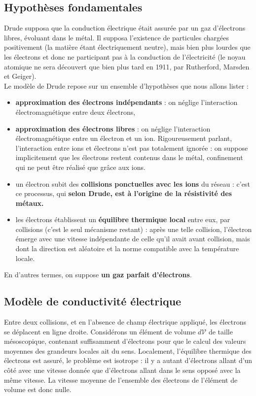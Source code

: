 \documentclass[11pt,a4paper]{report}
\begin{document}
\subsection{Hypothèses fondamentales}

Drude supposa que la conduction électrique était assurée par un gaz d'électrons libres, évoluant dans le métal. Il supposa l'existence de particules chargées positivement (la matière étant électriquement neutre), mais bien plus lourdes que les électrons et donc ne participant pas à la conduction de l'électricité (le noyau atomique ne sera découvert que bien plus tard en 1911, par Rutherford, Marsden et Geiger).\\
 
Le modèle de Drude repose sur un ensemble d'hypothèses que nous allons lister :
\begin{itemize}
	\item \textbf{approximation des électrons indépendants} : on néglige l'interaction électromagnétique entre deux électrons,
	\item \textbf{approximation des électrons libres} : on néglige l'interaction électromagnétique entre un électron et un ion. Rigoureusement parlant, l'interaction entre ions et électrons n'est pas totalement ignorée : on suppose implicitement que les électrons restent contenus dans le métal, confinement qui ne peut être réalisé que grâce aux ions.
	\item un électron subit des \textbf{collisions ponctuelles avec les ions} du réseau : c'est ce processus, qui \textbf{selon Drude, est à l'origine de la résistivité des métaux.} 
	\item les électrons établissent un \textbf{équilibre thermique local} entre eux, par collisions (c'est le seul mécanisme restant) : après une telle collision, l'électron émerge avec une vitesse indépendante de celle qu'il avait avant collision, mais dont la direction est aléatoire et la norme compatible avec la température locale.\\
\end{itemize}

En d'autres termes, on suppose \textbf{un gaz parfait d'électrons}.

\subsection{Modèle de conductivité électrique}

Entre deux collisions, et en l'absence de champ électrique appliqué, les électrons se déplacent en ligne droite. Considérons un élément de volume $d\mathcal{V}$ de taille mésoscopique, contenant suffisamment d'électrons pour que le calcul des valeurs moyennes des grandeurs locales ait du sens. Localement, l'équilibre thermique des électrons est assuré, le problème est isotrope : il y a autant d'électrons allant d'un côté avec une vitesse donnée que d'électrons allant dans le sens opposé avec la même vitesse. La vitesse moyenne de l'ensemble des électrons de l'élément de volume est donc nulle.\\
\end{document}
